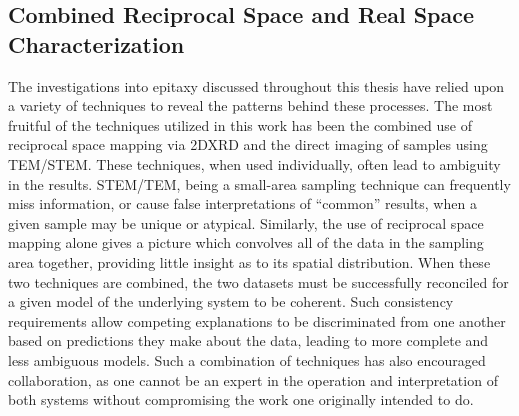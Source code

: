 \subsection{Combined Reciprocal Space and Real Space Characterization}
The investigations into epitaxy discussed throughout this thesis have relied upon a variety of techniques to reveal the patterns behind these processes. The most fruitful of the techniques utilized in this work has been the combined use of reciprocal space mapping via 2DXRD and the direct imaging of samples using TEM/STEM. These techniques, when used individually, often lead to ambiguity in the results. STEM/TEM, being a small-area sampling technique can frequently miss information, or cause false interpretations of ``common'' results, when a given sample may be unique or atypical. Similarly, the use of reciprocal space mapping alone gives a picture which convolves all of the data in the sampling area together, providing little insight as to its spatial distribution. When these two techniques are combined, the two datasets must be successfully reconciled for a given model of the underlying system to be coherent. Such consistency requirements allow competing explanations to be discriminated from one another based on predictions they make about the data, leading to more complete and less ambiguous models. Such a combination of techniques has also encouraged collaboration, as one cannot be an expert in the operation and interpretation of both systems without compromising the work one originally intended to do.